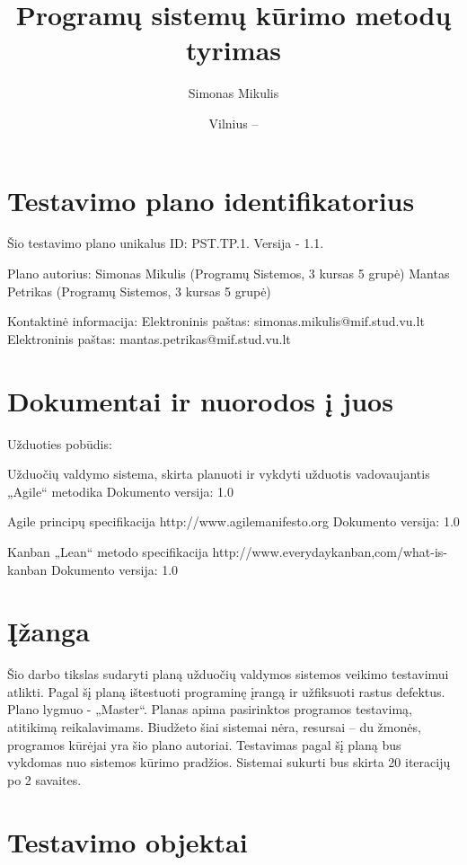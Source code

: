 \documentclass{VUMIFPSkursinis}
\title{Programų sistemų kūrimo metodų tyrimas}
\author{Simonas Mikulis}
\date{Vilnius – \the\year}
\begin{document}
      \maketitle
    
      \tableofcontents
  
    \section{Testavimo plano identifikatorius}
    
    Šio testavimo plano unikalus ID: PST.TP.1.  Versija - 1.1.
    
    Plano autorius: 
    Simonas Mikulis (Programų Sistemos, 3 kursas 5 grupė)
    Mantas Petrikas (Programų Sistemos, 3 kursas 5 grupė)
    
    Kontaktinė informacija:
    Elektroninis paštas: simonas.mikulis@mif.stud.vu.lt
    Elektroninis paštas: mantas.petrikas@mif.stud.vu.lt
    
    
    \section{Dokumentai ir nuorodos į juos}
    
    Užduoties pobūdis:
    
    Užduočių valdymo sistema, skirta planuoti ir vykdyti užduotis vadovaujantis „Agile“ metodika
    Dokumento versija: 1.0
    
    Agile principų specifikacija
    http://www.agilemanifesto.org
    Dokumento versija: 1.0
    
    Kanban „Lean“ metodo specifikacija
    http://www.everydaykanban,com/what-is-kanban
    Dokumento versija: 1.0
    
    
    \section{Įžanga}
    
    Šio darbo tikslas sudaryti planą užduočių valdymos sistemos veikimo testavimui atlikti.
    Pagal šį planą ištestuoti programinę įrangą ir užfiksuoti rastus defektus.
    Plano lygmuo - „Master“. Planas apima pasirinktos programos testavimą, atitikimą reikalavimams. 
    Biudžeto šiai sistemai nėra, resursai – du žmonės, programos kūrėjai yra šio plano autoriai. 
    Testavimas pagal šį planą bus vykdomas nuo sistemos kūrimo pradžios. Sistemai sukurti bus skirta 20 iteracijų po 2 savaites.
    
    
    \section{Testavimo objektai}
    
\end{document}
